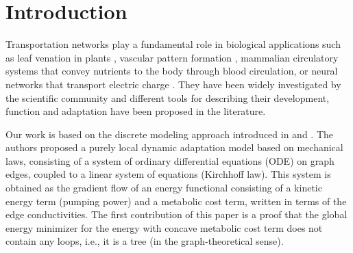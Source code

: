 \documentclass{article}
\numberwithin{equation}{section}
\begin{document}
        
\section{Introduction}\label{intro}
Transportation networks play a fundamental role in biological applications such as leaf venation in plants \cite{malinowski2013understanding},
vascular pattern formation \cite{sedmera2011function}, mammalian circulatory systems that convey nutrients to the body through blood circulation, or
neural networks that transport electric charge \cite{eichmann2005guidance, michel1995morphogenesis}.
They have been widely investigated by the scientific community and different tools for describing their development, function and adaptation have been proposed in the literature.

Our work is based on the discrete modeling approach introduced in \cite{hu2013optimization} and  \cite{hu2013adaptation}.
The authors proposed a purely local dynamic adaptation model based on mechanical laws, consisting of a system of ordinary differential equations (ODE) on graph edges,
coupled to a linear system of equations (Kirchhoff law). This system is obtained as the gradient flow of an energy functional consisting of a kinetic energy term (pumping power)
and a metabolic cost term, written in terms of the edge conductivities.
The first contribution of this paper is a proof that the global energy minimizer for the energy with concave metabolic cost term does not contain any loops,
i.e., it is a tree (in the graph-theoretical sense). %
\end{document}
